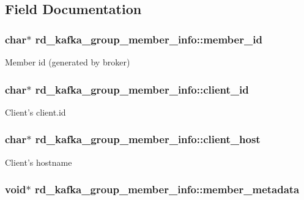 \subsection{Field Documentation}
\hypertarget{structrd__kafka__group__member__info_a388fd408bd980bf3baeef7e3c0465d60}{
\subsubsection[{member\_\-id}]{\setlength{\rightskip}{0pt plus 5cm}char$\ast$ {\bf rd\_\-kafka\_\-group\_\-member\_\-info::member\_\-id}}}
\label{structrd__kafka__group__member__info_a388fd408bd980bf3baeef7e3c0465d60}
Member id (generated by broker) \hypertarget{structrd__kafka__group__member__info_afb8a67cd4ecce66c17f5c2c2b7b8bac8}{
\subsubsection[{client\_\-id}]{\setlength{\rightskip}{0pt plus 5cm}char$\ast$ {\bf rd\_\-kafka\_\-group\_\-member\_\-info::client\_\-id}}}
\label{structrd__kafka__group__member__info_afb8a67cd4ecce66c17f5c2c2b7b8bac8}
Client's {\ttfamily client.id} \hypertarget{structrd__kafka__group__member__info_adaa6e3567a9baa4f97885de3c53f5ae1}{
\subsubsection[{client\_\-host}]{\setlength{\rightskip}{0pt plus 5cm}char$\ast$ {\bf rd\_\-kafka\_\-group\_\-member\_\-info::client\_\-host}}}
\label{structrd__kafka__group__member__info_adaa6e3567a9baa4f97885de3c53f5ae1}
Client's hostname \hypertarget{structrd__kafka__group__member__info_ac908871fe2c69611a4173773ab8abf2a}{
\subsubsection[{member\_\-metadata}]{\setlength{\rightskip}{0pt plus 5cm}void$\ast$ {\bf rd\_\-kafka\_\-group\_\-member\_\-info::member\_\-metadata}}}
